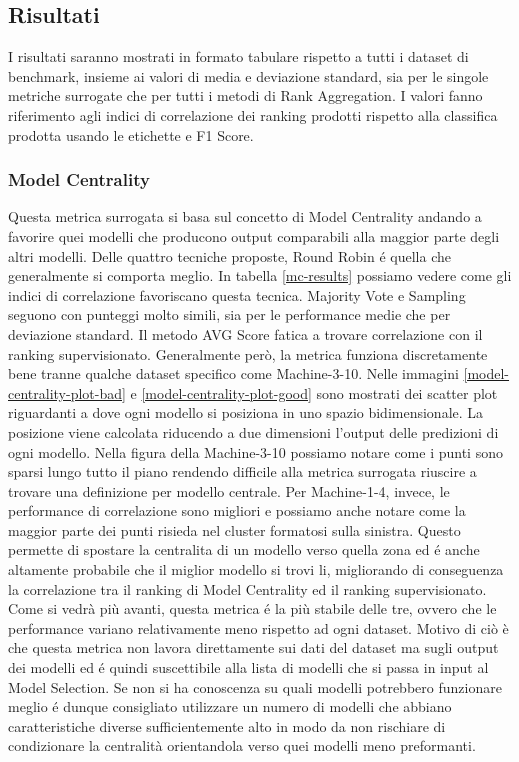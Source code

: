 \subsection{Risultati}
I risultati saranno mostrati in formato tabulare rispetto a tutti i dataset di benchmark, insieme ai valori di media e deviazione standard, sia per le singole metriche surrogate che per tutti i metodi di Rank Aggregation.
I valori fanno riferimento agli indici di correlazione dei ranking prodotti rispetto alla classifica prodotta usando le etichette e F1 Score.


\subsubsection{Model Centrality}
Questa metrica surrogata si basa sul concetto di Model Centrality andando a favorire quei modelli che producono output comparabili alla maggior parte degli altri modelli. Delle quattro tecniche proposte, Round Robin é quella che generalmente si comporta meglio. In tabella \ref{mc-results} possiamo vedere come gli indici di correlazione favoriscano questa tecnica.
Majority Vote e Sampling seguono con punteggi molto simili, sia per le performance medie che per deviazione standard. Il metodo AVG Score fatica a trovare correlazione con il ranking supervisionato. 
Generalmente però, la metrica funziona discretamente bene tranne qualche dataset specifico come Machine-3-10.  Nelle immagini \ref{model-centrality-plot-bad} e \ref{model-centrality-plot-good} sono mostrati dei scatter plot riguardanti a dove ogni modello si posiziona in uno spazio bidimensionale. La posizione viene calcolata riducendo a due dimensioni l'output delle predizioni di ogni modello.  Nella figura della Machine-3-10 possiamo notare come i punti sono sparsi lungo tutto il piano rendendo difficile alla metrica surrogata riuscire a trovare una definizione per modello centrale.
Per Machine-1-4, invece, le performance di correlazione sono migliori e possiamo anche notare come la maggior parte dei punti risieda nel cluster formatosi sulla sinistra. Questo permette di spostare la centralita di un modello verso quella zona ed é anche altamente probabile che il miglior modello si trovi li, migliorando di conseguenza la correlazione tra il ranking di Model Centrality ed il ranking supervisionato.
Come si vedrà più avanti, questa metrica é la più stabile delle tre, ovvero che le performance variano relativamente meno rispetto ad ogni dataset. Motivo di ciò è che questa metrica non lavora direttamente sui dati del dataset ma sugli output dei modelli ed é quindi suscettibile alla lista di modelli che si passa in input al Model Selection. Se non si ha conoscenza su quali modelli potrebbero funzionare meglio é dunque consigliato utilizzare un numero di modelli che abbiano caratteristiche diverse sufficientemente alto in modo da non rischiare di condizionare la centralità orientandola verso quei modelli meno preformanti.


